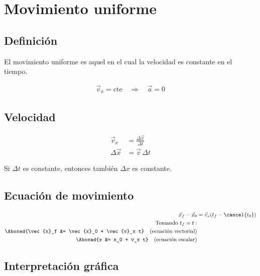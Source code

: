 \section{Movimiento uniforme}

\subsection{Definición}
El movimiento uniforme es aquel en el cual la velocidad es constante en el tiempo.
\vspace{-20pt}

\begin{align*}
\vec{v}_x = \text{cte} \quad \Rightarrow \quad \vec{a} = 0
\end{align*}

\vspace{-20pt}

\subsection{Velocidad}
\vspace{-20pt}

\begin{align*}
\vec{v}_x &= \frac{\Delta \vec{x}}{\Delta t} \\
\Delta \vec{x} &= \vec{v}\,\Delta t
\end{align*}

Si $\Delta t$ es constante, entonces también $\Delta x$ es constante.

\vspace{-10pt}

\subsection{Ecuación de movimiento}
\vspace{-30pt}

\begin{align*}
\vec{x}_f - \vec{x}_0 &= \vec{v}_x (t_f - \cancel{t_0}) \\
\text{Tomando } t_f = t: \\
\Aboxed{\vec{x}_f &= \vec{x}_0 + \vec{v}_x t} \quad \text{(ecuación vectorial)} \\
\Aboxed{x &= x_0 + v_x t} \quad \text{(ecuación escalar)}
\end{align*}

\subsection{Interpretación gráfica}


